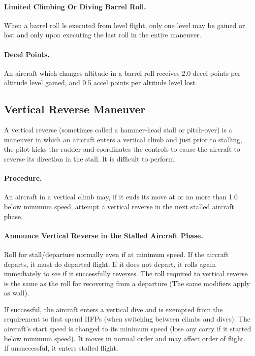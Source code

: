 \paragraph{Limited Climbing Or Diving Barrel Roll.} When a barrel roll ls executed from level flight, only one level may be gained or lost and only upon executing the last roll in the entire maneuver.

\paragraph{Decel Points.} An aircraft which changes altitude in a barrel roll receives 2.0 decel points per altitude level gained, and 0.5 accel points per altitude level lost.

\subsection{Vertical Reverse Maneuver}

A vertical reverse (sometimes called a hammer-head stall or pitch-over) is a maneuver in which an aircraft enters a vertical climb and just prior to stalling, the pilot kicks the rudder and coordinates the controls to cause the aircraft to reverse its direction in the stall. It is difficult to perform.

\paragraph{Procedure.} An aircraft in a vertical climb may, if it ends its move at or no more than 1.0 below minimum speed, attempt a vertical reverse in the next stalled aircraft phase,

\paragraph{Announce Vertical Reverse in the Stalled Aircraft Phase.} Roll for stall/departure normally even if at minimum speed. If the aircraft departs, it must do departed flight. If it does not depart, it rolls again immediately to see if it successfully reverses. The roll required to vertical reverse is the same as the roll for recovering from a departure (The same modifiers apply as wall). 

If successful, the aircraft enters a vertical dive and is exempted from the requirement to first spend HFPs (when switching between climbs and dives). The aircraft's start speed is changed to its minimum speed (lose any  carry if it started below minimum speed). It moves in normal order and may affect order of flight. If unsuccessful, it enters stalled flight.

